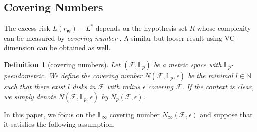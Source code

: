 \documentclass[letterpaper]{article} %
\newtheorem{definition}{Definition}
\newcommand{\weight}{\mathbf{w}}
\newcommand{\real}{\mathbb{R}}
\newcommand{\bayeserror}{L^*}
\newcommand{\risk}{L}
\newcommand{\lebesgue}{\mathbb{L}}
\newcommand{\red}[1]{\textcolor{red}{#1}}
\newcommand{\todo}[1]{\red{\textsc{todo:} #1}}
\begin{document}
\subsection{Covering Numbers} %
\label{sub:covering number}
The excess risk $\risk{}(r_\weight{})-\bayeserror{}$ depends on the hypothesis set $R$ whose complexity can be measured by \emph{covering number} \cite{cucker2007learning}. 
A similar but looser result using VC-dimension \cite{vapnik1971uniform} can be obtained as well. 

\begin{definition}[covering numbers]
Let $(\mathcal{F}, \lebesgue{}_p)$ be a metric space with $\lebesgue{}_p$-pseudometric. We define the covering number $N(\mathcal{F},\lebesgue{}_p,\epsilon)$ be the minimal $l\in\mathbb{N}$ such that there exist $l$ disks in $\mathcal{F}$ with radius $\epsilon$ covering $\mathcal{F}$. If the context is clear, we simply denote $N(\mathcal{F},\lebesgue{}_p, \epsilon)$ by $N_p(\mathcal{F},\epsilon)$.


\end{definition}

In this paper, we focus on the $\lebesgue_\infty$ covering number $N_\infty(\mathcal{F},\epsilon)$ and suppose that it satisfies the following assumption.
\end{document}
